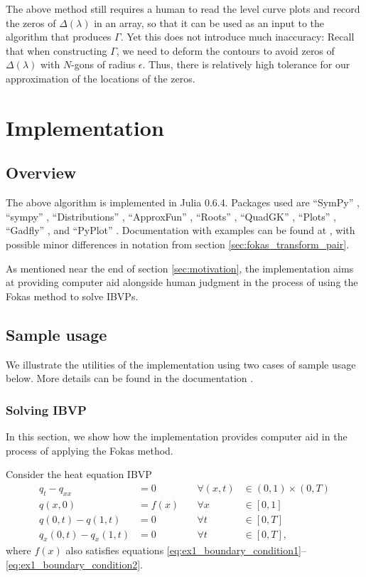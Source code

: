 \documentclass[12pt, oneside, a4paper]{article}
\begin{document}
The above method still requires a human to read the level curve plots and record the zeros of $\Delta(\lambda)$ in an array, so that it can be used as an input to the algorithm that produces $\Gamma$. Yet this does not introduce much inaccuracy: Recall that when constructing $\Gamma$, we need to deform the contours to avoid zeros of $\Delta(\lambda)$ with $N$-gons of radius $\epsilon$. Thus, there is relatively high tolerance for our approximation of the locations of the zeros.

\section{Implementation}
\subsection{Overview}
The above algorithm is implemented in Julia 0.6.4. Packages used are ``SymPy'' \cite{sympy}, ``sympy'' \cite{sympyPython},  ``Distributions'' \cite{distributions}, ``ApproxFun'' \cite{approxfun}, ``Roots'' \cite{roots}, ``QuadGK'' \cite{quadgk}, ``Plots'' \cite{plots}, ``Gadfly'' \cite{gadfly}, and ``PyPlot'' \cite{pyplot}. Documentation with examples can be found at \cite{Xiao}, with possible minor differences in notation from section \ref{sec:fokas_transform_pair}.

As mentioned near the end of section \ref{sec:motivation}, the implementation aims at providing computer aid alongside human judgment in the process of using the Fokas method to solve IBVPs.

\subsection{Sample usage}
We illustrate the utilities of the implementation using two cases of sample usage below. More details can be found in the documentation \cite{Xiao}.

\subsubsection{Solving IBVP}\label{sec:ex1}
In this section, we show how the implementation provides computer aid in the process of applying the Fokas method.

Consider the heat equation IBVP
\begin{subequations}\label{eq:ex1}
    \begin{alignat}{3}
        q_t - q_{xx} &= 0\quad &\forall (x,t)&\in (0,1)\times (0,T) \label{eq:ex1_PDE}\\
        q(x,0) &= f(x) \quad &\forall x&\in [0,1]\label{eq:ex1_initial_condition}\\
        q(0,t) - q(1,t) &= 0 &\forall t&\in [0,T]\label{eq:ex1_boundary_condition1}\\
        q_x(0,t) - q_x(1,t) &= 0 &\forall t&\in [0,T]\label{eq:ex1_boundary_condition2},
    \end{alignat}
\end{subequations}
where $f(x)$ also satisfies equations \eqref{eq:ex1_boundary_condition1}--\eqref{eq:ex1_boundary_condition2}.
\end{document}
